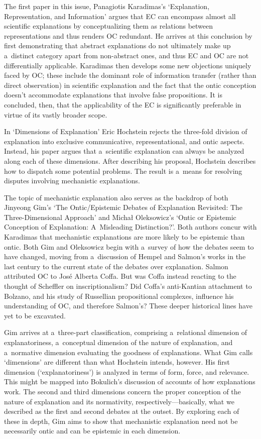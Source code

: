 The first paper in this issue, Panagiotis Karadimas's ‘Explanation, Representation, and Information' argues that EC can encompass almost all scientific explanations by conceptualizing them as relations between representations and thus renders OC redundant. He arrives at this conclusion by first demonstrating that abstract explanations do not ultimately make up a~distinct category apart from non-abstract ones, and thus EC and OC are not differentially applicable. Karadimas then develops some new objections uniquely faced by OC; these include the dominant role of information transfer (rather than direct observation) in scientific explanation and the fact that the ontic conception doesn't accommodate explanations that involve false propositions. It is concluded, then, that the applicability of the EC is significantly preferable in virtue of its vastly broader scope.

In ‘Dimensions of Explanation' Eric Hochstein rejects the three-fold division of explanation into exclusive communicative, representational, and ontic aspects. Instead, his paper argues that a~scientific explanation can always be analyzed along each of these dimensions. After describing his proposal, Hochstein describes how to dispatch some potential problems. The result is a~means for resolving disputes involving mechanistic explanations.

The topic of mechanistic explanation also serves as the backdrop of both Jinyeong Gim's ‘The Ontic/Epistemic Debates of Explanation Revisited: The Three-Dimensional Approach' and Michał Oleksowicz's ‘Ontic or Epistemic Conception of Explanation: A~Misleading Distinction?'. Both authors concur with Karadimas that mechanistic explanations are more likely to be epistemic than ontic. Both Gim and Oleksowicz begin with a~survey of how the debates seem to have changed, moving from a~discussion of Hempel and Salmon's works in the last century to the current state of the debates over explanation. Salmon
\parencite*[][]{salmon_four_1989} %
 attributed OC to José Alberta Coffa. But was Coffa instead reacting to the thought of Scheffler 
\parencite*[][]{scheffler_anatomy_1963} %
 on inscriptionalism? Did Coffa's anti-Kantian attachment to Bolzano, and his study of Russellian propositional complexes, influence his understanding of OC, and therefore Salmon's? These deeper historical lines have yet to be excavated.

Gim arrives at a~three-part classification, comprising a~relational dimension of explanatoriness, a~conceptual dimension of the nature of explanation, and a~normative dimension evaluating the goodness of explanations. What Gim calls ‘dimensions' are different than what Hochstein intends, however. His first dimension (‘explanatoriness') is analyzed in terms of form, force, and relevance. This might be mapped into Bokulich's discussion of accounts of how explanations work. The second and third dimensions concern the proper conception of the nature of explanation and its normativity, respectively---basically, what we described as the first and second debates at the outset. By exploring each of these in depth, Gim aims to show that mechanistic explanation need not be necessarily ontic and can be epistemic in each dimension.

